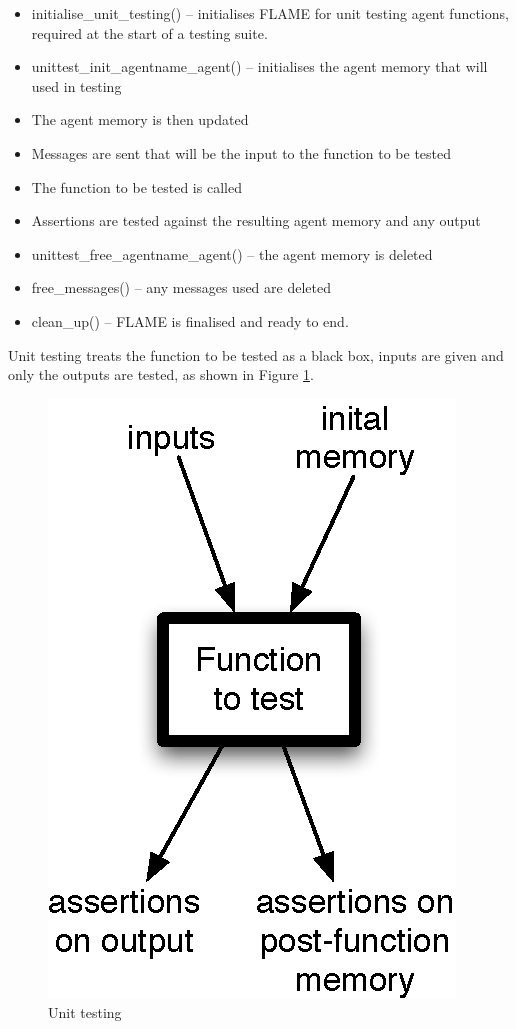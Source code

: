 \begin{itemize}
  \item initialise\_unit\_testing() -- initialises FLAME for unit testing agent
  functions, required at the start of a testing suite.
  \item unittest\_init\_agentname\_agent() -- initialises the agent memory that
  will used in testing
  \item The agent memory is then updated
  \item Messages are sent that will be the input to the function to be tested
  \item The function to be tested is called
  \item Assertions are tested against the resulting agent memory and any output
  \item unittest\_free\_agentname\_agent() -- the agent memory is deleted
  \item free\_messages() -- any messages used are deleted
  \item clean\_up() -- FLAME is finalised and ready to end.
\end{itemize}

Unit testing treats the function to be tested as a black box, inputs are given
and only the outputs are tested, as shown in Figure \ref{fig:unittesting}.

\begin{figure}[hb]
\centering
\includegraphics[scale=1.0]{unittest.eps}
\caption{Unit testing}
\label{fig:unittesting}
\end{figure}

